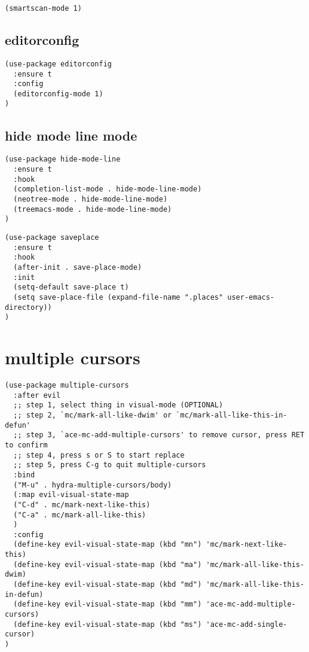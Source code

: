 \documentclass[11pt]{article}
\begin{document}
\begin{verbatim}
(smartscan-mode 1)
\end{verbatim}

\subsection*{editorconfig}
\label{sec:orgc83b443}

\begin{verbatim}
(use-package editorconfig
  :ensure t
  :config
  (editorconfig-mode 1)
)
\end{verbatim}

\subsection*{hide mode line mode}
\label{sec:orgdcb1684}

\begin{verbatim}
(use-package hide-mode-line
  :ensure t
  :hook
  (completion-list-mode . hide-mode-line-mode)
  (neotree-mode . hide-mode-line-mode)
  (treemacs-mode . hide-mode-line-mode)
)
\end{verbatim}


\begin{verbatim}
(use-package saveplace
  :ensure t
  :hook
  (after-init . save-place-mode)
  :init
  (setq-default save-place t)
  (setq save-place-file (expand-file-name ".places" user-emacs-directory))
)
\end{verbatim}

\section*{multiple cursors}
\label{sec:orgbfaf68b}

\begin{verbatim}
(use-package multiple-cursors
  :after evil
  ;; step 1, select thing in visual-mode (OPTIONAL)
  ;; step 2, `mc/mark-all-like-dwim' or `mc/mark-all-like-this-in-defun'
  ;; step 3, `ace-mc-add-multiple-cursors' to remove cursor, press RET to confirm
  ;; step 4, press s or S to start replace
  ;; step 5, press C-g to quit multiple-cursors
  :bind
  ("M-u" . hydra-multiple-cursors/body)
  (:map evil-visual-state-map
  ("C-d" . mc/mark-next-like-this)
  ("C-a" . mc/mark-all-like-this)
  )
  :config
  (define-key evil-visual-state-map (kbd "mn") 'mc/mark-next-like-this)
  (define-key evil-visual-state-map (kbd "ma") 'mc/mark-all-like-this-dwim)
  (define-key evil-visual-state-map (kbd "md") 'mc/mark-all-like-this-in-defun)
  (define-key evil-visual-state-map (kbd "mm") 'ace-mc-add-multiple-cursors)
  (define-key evil-visual-state-map (kbd "ms") 'ace-mc-add-single-cursor)
)
\end{verbatim}
\end{document}
